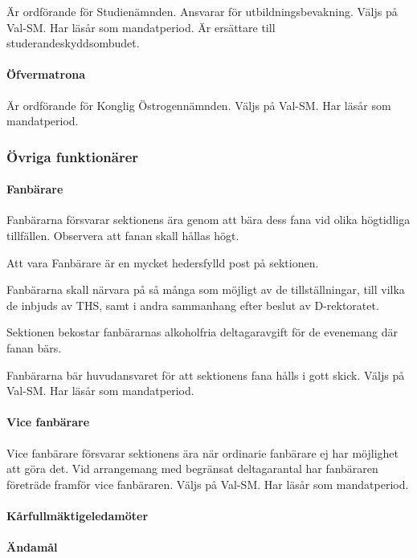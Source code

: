 \documentclass[a4paper,12pt]{article}
\begin{document}
Är ordförande för Studienämnden. Ansvarar för utbildningsbevakning. Väljs på Val-SM. Har läsår som mandatperiod. Är ersättare till studerandeskyddsombudet.

\paragraph{Öfvermatrona}

Är ordförande för Konglig Östrogennämnden. Väljs på Val-SM. Har läsår som
mandatperiod.

\subsubsection{Övriga funktionärer}

\paragraph{Fanbärare}

Fanbärarna försvarar sektionens ära genom att bära dess fana vid olika högtidliga tillfällen. Observera att fanan skall hållas högt.

Att vara Fanbärare är en mycket hedersfylld post på sektionen.

Fanbärarna skall närvara på så många som möjligt av de tillställningar, till vilka de inbjuds av THS, samt i andra sammanhang efter beslut av D-rektoratet.

Sektionen bekostar fanbärarnas alkoholfria deltagaravgift för de evenemang där fanan bärs.

Fanbärarna bär huvudansvaret för att sektionens fana hålls i gott skick. Väljs på Val-SM. Har läsår som mandatperiod.

\paragraph{Vice fanbärare}

Vice fanbärare försvarar sektionens ära när ordinarie fanbärare ej har möjlighet att göra det. Vid arrangemang med begränsat deltagarantal har fanbäraren företräde framför vice fanbäraren. Väljs på Val-SM. Har läsår som mandatperiod.

\paragraph{Kårfullmäktigeledamöter}

\paragraph{Ändamål}
\end{document}
